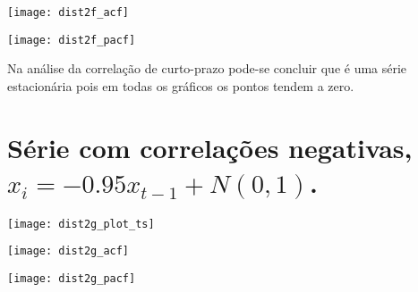 \begin{center}
\begin{centering}
\texttt{[image: dist2f\_acf]}
\par\end{centering}
\par\end{center}

\begin{center}
\begin{centering}
\texttt{[image: dist2f\_pacf]}
\par\end{centering}
\par\end{center}

Na análise da correlação de curto-prazo pode-se concluir que é uma série estacionária pois em todas os gráficos os pontos tendem a zero.


\section{Série com correlações negativas, $x_{i}=-0.95x_{t-1}+N(0,1)$.}

\begin{center}
\begin{centering}
\texttt{[image: dist2g\_plot\_ts]}
\par\end{centering}
\par\end{center}

\begin{center}
\begin{centering}
\texttt{[image: dist2g\_acf]}
\par\end{centering}
\par\end{center}

\begin{center}
\begin{centering}
\texttt{[image: dist2g\_pacf]}
\par\end{centering}
\par\end{center}


